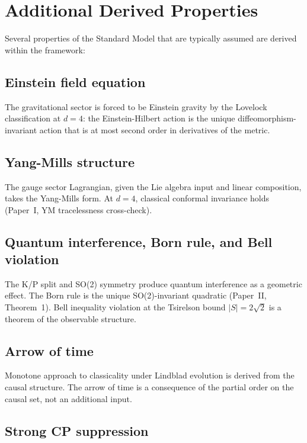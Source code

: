 \documentclass[11pt,letterpaper]{article}
\begin{document}
\section{Additional Derived Properties}

Several properties of the Standard Model that are typically assumed
are derived within the framework:

\subsection{Einstein field equation}

The gravitational sector is forced to be Einstein gravity by the
Lovelock classification at $d = 4$: the Einstein-Hilbert action is
the unique diffeomorphism-invariant action that is at most second
order in derivatives of the metric.

\subsection{Yang-Mills structure}

The gauge sector Lagrangian, given the Lie algebra input and linear
composition, takes the Yang-Mills form. At $d = 4$, classical
conformal invariance holds (Paper~I, YM tracelessness cross-check).

\subsection{Quantum interference, Born rule, and Bell violation}

The K/P split and SO(2) symmetry produce quantum interference as a
geometric effect. The Born rule is the unique SO(2)-invariant quadratic
(Paper~II, Theorem~1). Bell inequality violation at the Tsirelson bound
$|S| = 2\sqrt{2}$ is a theorem of the observable structure.

\subsection{Arrow of time}

Monotone approach to classicality under Lindblad evolution is derived
from the causal structure. The arrow of time is a consequence of the
partial order on the causal set, not an additional input.

\subsection{Strong CP suppression}
\end{document}
